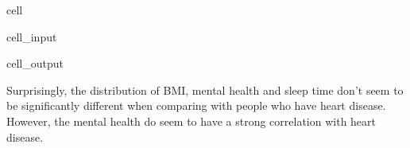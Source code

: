 \documentclass[letterpaper,10pt,english]{jupyterBook}
\begin{document}
\begin{sphinxuseclass}{cell}\begin{sphinxVerbatimInput}

\begin{sphinxuseclass}{cell_input}
\begin{sphinxVerbatim}[commandchars=\\\{\}]
\PYG{p}{[}
    \PYG{p}{[}    \PYG{p}{]}
    \PYG{p}{]}    
\end{sphinxVerbatim}

\end{sphinxuseclass}\end{sphinxVerbatimInput}
\begin{sphinxVerbatimOutput}

\begin{sphinxuseclass}{cell_output}
\noindent{}

\end{sphinxuseclass}\end{sphinxVerbatimOutput}

\end{sphinxuseclass}
\sphinxAtStartPar
Surprisingly, the distribution of BMI, mental health and sleep time don’t seem to be significantly different when comparing with people who  have heart disease. However, the mental health do seem to have a strong correlation with heart disease.
\end{document}
